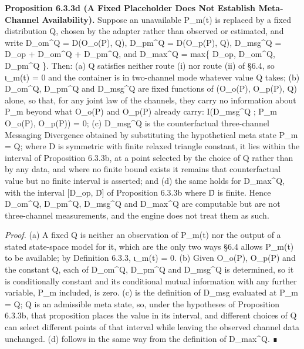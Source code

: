 \documentclass[
]{article}
\begin{document}
\textbf{Proposition 6.3.3d (A Fixed Placeholder Does Not Establish
Meta-Channel Availability).} Suppose an unavailable P\_m(t) is replaced
by a fixed distribution Q, chosen by the adapter rather than observed or
estimated, and write D\_om\^{}Q = D(O\_o(P), Q), D\_pm\^{}Q = D(O\_p(P),
Q), D\_msg\^{}Q = D\_op + D\_om\^{}Q + D\_pm\^{}Q, and D\_max\^{}Q =
max\{ D\_op, D\_om\^{}Q, D\_pm\^{}Q \}. Then: (a) Q satisfies neither
route (i) nor route (ii) of §6.4, so ι\_m(t) = 0 and the container is in
two-channel mode whatever value Q takes; (b) D\_om\^{}Q, D\_pm\^{}Q and
D\_msg\^{}Q are fixed functions of (O\_o(P), O\_p(P), Q) alone, so that,
for any joint law of the channels, they carry no information about P\_m
beyond what O\_o(P) and O\_p(P) already carry: I(D\_msg\^{}Q ; P\_m
\textbar{} O\_o(P), O\_p(P)) = 0; (c) D\_msg\^{}Q is the counterfactual
three-channel Messaging Divergence obtained by substituting the
hypothetical meta state P\_m = Q; where D is symmetric with finite
relaxed triangle constant, it lies within the interval of Proposition
6.3.3b, at a point selected by the choice of Q rather than by any data,
and where no finite bound exists it remains that counterfactual value
but no finite interval is asserted; and (d) the same holds for
D\_max\^{}Q, with the interval {[}D\_op, D̄{]} of Proposition 6.3.3b
where D̄ is finite. Hence D\_om\^{}Q, D\_pm\^{}Q, D\_msg\^{}Q and
D\_max\^{}Q are computable but are not three-channel measurements, and
the engine does not treat them as such.

\emph{Proof.} (a) A fixed Q is neither an observation of P\_m(t) nor the
output of a stated state-space model for it, which are the only two ways
§6.4 allows P\_m(t) to be available; by Definition 6.3.3, ι\_m(t) = 0.
(b) Given O\_o(P), O\_p(P) and the constant Q, each of D\_om\^{}Q,
D\_pm\^{}Q and D\_msg\^{}Q is determined, so it is conditionally
constant and its conditional mutual information with any further
variable, P\_m included, is zero. (c) is the definition of D\_msg
evaluated at P\_m = Q; Q is an admissible meta state, so, under the
hypotheses of Proposition 6.3.3b, that proposition places the value in
its interval, and different choices of Q can select different points of
that interval while leaving the observed channel data unchanged. (d)
follows in the same way from the definition of D\_max\^{}Q. ∎
\end{document}
